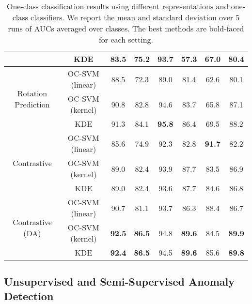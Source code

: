 \documentclass{article} \usepackage{iclr2021_conference,times}
\newcommand{\contrastive}{Contrastive}
\begin{document}
\begin{table}[ht]
{\begin{tabular}{c|c|c|c|c|c|c|c}
         & KDE & 83.5{\scriptsize} & 75.2{\scriptsize} & 93.7{\scriptsize} & 57.3{\scriptsize} & 67.0{\scriptsize} & 80.4 \\
        \midrule
        \multirow{3}{*}{{Rotation Prediction}} & OC-SVM (linear) & 88.5{\scriptsize} & 72.3{\scriptsize} & 89.0{\scriptsize} & 81.4{\scriptsize} & 62.6{\scriptsize} & 80.1 \\
         & OC-SVM (kernel) & 90.8{\scriptsize} & 82.8{\scriptsize} & 94.6{\scriptsize} & 83.7{\scriptsize} & 65.8{\scriptsize} & 87.1 \\
         & KDE & 91.3{\scriptsize} & 84.1{\scriptsize} & \textbf{95.8}{\scriptsize} & 86.4{\scriptsize} & 69.5{\scriptsize} & 88.2 \\
        \midrule
        \multirow{3}{*}{{\contrastive}} & OC-SVM (linear) & 85.6{\scriptsize} & 74.9{\scriptsize} & 92.3{\scriptsize} & 82.8{\scriptsize} & \textbf{91.7}{\scriptsize} & 82.2 \\
         & OC-SVM (kernel) & 89.0{\scriptsize} & 82.4{\scriptsize} & 93.9{\scriptsize} & 87.7{\scriptsize} & 83.5{\scriptsize} & 86.9 \\
         & KDE & 89.0{\scriptsize} & 82.4{\scriptsize} & 93.6{\scriptsize} & 87.7{\scriptsize} & 84.6{\scriptsize} & 86.8 \\
        \midrule
        \multirow{3}{*}{{\contrastive} (DA)} & OC-SVM (linear) & 90.7{\scriptsize} & 81.1{\scriptsize} & 93.7{\scriptsize} & 86.3{\scriptsize} & 88.4{\scriptsize} & 86.7 \\
         & OC-SVM (kernel) & \textbf{92.5}{\scriptsize} & \textbf{86.5}{\scriptsize} & 94.8{\scriptsize} & \textbf{89.6}{\scriptsize} & 84.5{\scriptsize} & \textbf{89.9} \\
         & KDE & \textbf{92.4}{\scriptsize} & \textbf{86.5}{\scriptsize} & 94.5{\scriptsize} & \textbf{89.6}{\scriptsize} & 85.6{\scriptsize} & \textbf{89.8} \\
\bottomrule
    \end{tabular}
    }
    \caption{One-class classification results using different representations and one-class classifiers. We report the mean and standard deviation over 5 runs of AUCs averaged over classes. The best methods are bold-faced for each setting.}
    \label{tab:visual_results_full}
\end{table}


\subsection{Unsupervised and Semi-Supervised Anomaly Detection}
\label{sec:supp_ablation_unsupervised_AD}
\end{document}
